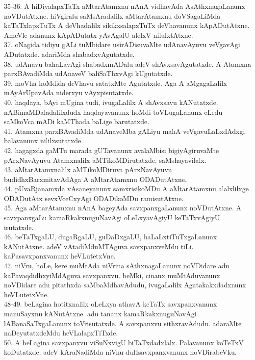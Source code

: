 \documentclass{article}
\begin{document}
35-36. A hiDiyalapxTaTx aMtarAtamxnu nAnA vidhavAda AsAthxnagaLanunx noVDutAtxne. hiVgiralu saMsAradalilx aMtarAtamxnu doVSagaLiMda kaTaTxlapxTuTx A deVhadalilx sikikxsalapxTuTx deVhavanunx kApADutAtxne. AmeVle adanunx kApADutatx yAvAgalU alelxV nilulxtAtxne.\\
37. oNagida tidiyu gALi tuMbidare usirADisuvaMte udAnavAyuvu veVgavAgi ADutatxde. adariMda shabadxvAgutatxde.\\
38. udAnavu bahaLavAgi shabadxmADalu adeV shAvxsavAgutatxde. A Atamxna parxBAvadiMda udAnaveV baliSaThxvAgi kUgutatxde.\\
39. moVha hoMdida deVhavu satatxMte Agutatxde. Aga A aMgagaLalilx mAyArUpavAda niderxyu vAyxpisutatxde.\\
40. haqdaya, bAyi mUgina tudi, ivugaLalilx A shAvxsavu kANutatxde. nABimaMDaladalilxdudx haqdayavanunx hoMdi toVLugaLanunx eLedu saMkoVca mADi kaMThada baLige barutatxde.\\
41. Atamxna parxBAvadiMda udAnaveMba gALiyu mahA veVgavuLaLxdAdxgi balavanunx nililxsutatxde.\\
42. hagagxda gaMTu marada gUTavanunx avalaMbisi bigiyAgiruvaMte pArxNavAyuvu Atamxnalilx aMTikoMDirutatxde. saMshayavilalx.\\
43. aMtarAtamxnalilx aMTikoMDiruva pArxNavAyuvu budidhxBarxmitavAdAga A aMtarAtamxnu ODADutAtxne.\\
44. pUvaRjanamxda vAsaneyanunx samxrisikoMDu A aMtarAtamxnu alalxlilxge ODADutAtx sevxVceCxyAgi ODADikoMDu ramisutAtxne.\\
45. Aga aMtarAtamxnu nAnA bageyAda savxpanxgaLanunx noVDutAtxne. A savxpanxgaLu kamaRkakxnuguNavAgi oLeLxyavAgiyU keTaTxvAgiyU irutatxde.\\
46. beTaTxgaLU, dugaRgaLU, guDaDxgaLU, haLaLxtiTuTxgaLanunx kANutAtxne. adeV vAtadiMduMTAguva savxpanxveMdu tiLi. kaPasavxpanxvanunx heVLutetxVne.\\
47. niVru, hoLe, kere muMtAda niVrina sAthxnagaLanunx noVDidare adu kaPavaqdidhxyiMdAguva savxpanxvu. beMki, cinanx muMtAduvanunx noVDidare adu pitathxda saMbaMdhavAdudu, ivugaLalilx Agatakakxdadxnunx heVLutetxVne.\\
48-49. beLagina hotitxnalilx oLeLxya athavA keTaTx savxpanxvanunx manuSayxnu kANutAtxne. adu tananx kamaRkakxnuguNavAgi lABanaSaTxgaLanunx toVrisutatxde. A savxpanxvu sithxravAdudu. adaraMte naDeyutatxdeMdu heVLalapxTiTxde.\\
50. A beLagina savxpanxvu viSuNxvigU biTaTxdadxlalx. Palavanunx koTeTxV koDutatxde. adeV kAraNadiMda niVnu duHsavxpanxvanunx noVDirabeVku.
\end{document}
